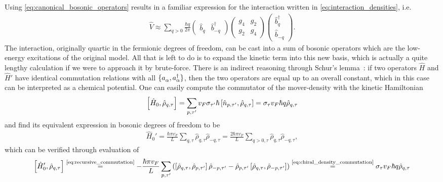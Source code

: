 Using \cref{eq:canonical_bosonic_operators} results in a familiar expression for the interaction written in \cref{eq:interaction_densities}, i.e.
\begin{align}
    \hat V \approx\sum_{q>0}\frac{\hbar q}{2\pi}
    \begin{pmatrix}
        \hat b_q & \hat b^\dag_{-q}
    \end{pmatrix}
    \begin{pmatrix}
        g_4 & g_2 \\
        g_2 & g_4
    \end{pmatrix}
    \begin{pmatrix}
        \hat b^\dag_q \\ \hat b_{-q}
    \end{pmatrix}
    .
    \label{eq:quadratic_interactions}
\end{align}
The interaction, originally quartic in the fermionic degrees of freedom, can be cast into a sum of bosonic operators which are the low-energy excitations of the original model.
All that is left to do is to expand the kinetic term into this new basis, which is actually a quite lengthy calculation if we were to approach it by brute-force.
There is an indirect reasoning through Schur's lemma~\cite{schur_neue_1905}: if two operators $\hat H$ and $\hat H'$ have identical commutation relations with all $\{a^\pdag_\alpha,a^\dag_\alpha\}$, then the two operators are equal up to an overall constant, which in this case can be interpreted as a chemical potential.
One can easily compute the commutator of the mover-density with the kinetic Hamiltonian
\begin{align}
    \left[ \hat H_0, \hat\rho_{q,\tau} \right]
    =
    \sum_{p,\tau'}v_F\sigma_{\tau'}\hbar \left[ \hat n_{p,\tau'},\hat\rho_{q,\tau} \right]
    =
    \sigma_\tau v_F \hbar q \hat\rho_{q,\tau}
\end{align}
and find its equivalent expression in bosonic degrees of freedom to be
\begin{align}
    \hat H_0' = \frac{\hbar \pi v_F}L\sum_{q,\tau}\hat\rho_{q,\tau}\hat\rho_{-q,\tau} = \frac{2\hbar\pi v_F}L\sum_{q>0,\tau}\hat\rho_{q,\tau}\hat\rho_{-q,\tau},
\end{align}
which can be verified through evaluation of
\begin{align}
    \commutator{\hat H_0',\hat\rho_{q,\tau}}
    \overset{\text{\cref{eq:recursive_commutation}}}{=}
    -\frac{\hbar \pi v_F}L
    \sum_{p,\tau'}
    \brlr{
    \commutator{\hat\rho_{q,\tau},\hat\rho_{p,\tau'}}\hat\rho_{-p,\tau'}
    -
    \hat\rho_{p,\tau'}\commutator{\hat\rho_{q,\tau},\hat\rho_{-p,\tau'}}
    }
    \overset{\text{\cref{eq:chiral_density_commutation}}}{=}
    \sigma_\tau v_F \hbar q\hat\rho_{q,\tau}
\end{align}
